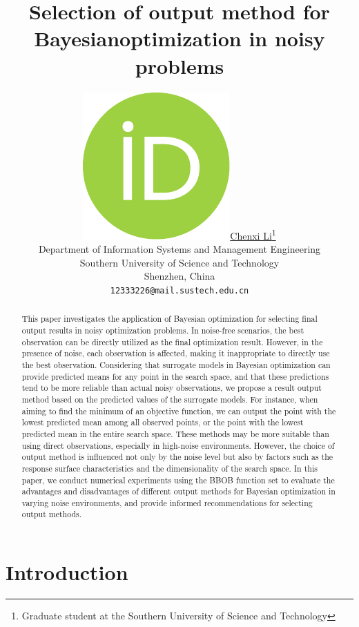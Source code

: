 \documentclass{article}
\title{Selection of output method for Bayesianoptimization in noisy problems}
\date{} 					%
\author{ \href{https://www.sustech.edu.cn/}{\includegraphics[scale=0.06]{orcid.pdf}\hspace{1mm}Chenxi Li}\thanks{Graduate student at the Southern University of Science and Technology} \\
	Department of Information Systems and Management Engineering\\
	Southern University of Science and Technology\\
	Shenzhen, China\\
	\texttt{12333226@mail.sustech.edu.cn} \\
}
\begin{document}
\maketitle

\begin{abstract}
	\hspace{2em}This paper investigates the application of Bayesian optimization for selecting final output results in noisy optimization problems. In noise-free scenarios, the best observation can be directly utilized as the final optimization result. However, in the presence of noise, each observation is affected, making it inappropriate to directly use the best observation. Considering that surrogate models in Bayesian optimization can provide predicted means for any point in the search space, and that these predictions tend to be more reliable than actual noisy observations, we propose a result output method based on the predicted values of the surrogate models. For instance, when aiming to find the minimum of an objective function, we can output the point with the lowest predicted mean among all observed points, or the point with the lowest predicted mean in the entire search space. These methods may be more suitable than using direct observations, especially in high-noise environments. However, the choice of output method is influenced not only by the noise level but also by factors such as the response surface characteristics and the dimensionality of the search space. In this paper, we conduct numerical experiments using the BBOB function set to evaluate the advantages and disadvantages of different output methods for Bayesian optimization in varying noise environments, and provide informed recommendations for selecting output methods.

\end{abstract}





\section{Introduction}
\end{document}
